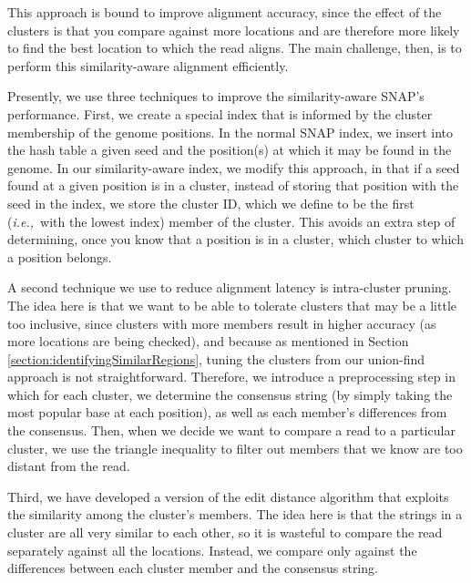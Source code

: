 \documentclass[twocolumn,10pt]{article}
\newcommand{\ie}{{\em i.e.,}~}
\begin{document}
This approach is bound to improve alignment accuracy, since the effect of the clusters is that you compare against more locations and are therefore more likely to find the best location to which the read aligns.  The main challenge, then, is to perform this similarity-aware alignment efficiently.  

Presently, we use three techniques to improve the similarity-aware SNAP's performance.  First, we create a special index that is informed by the cluster membership of the genome positions.  In the normal SNAP index, we insert into the hash table a given seed and the position(s) at which it may be found in the genome.  In our similarity-aware index, we modify this approach, in that if a seed found at a given position is in a cluster, instead of storing that position with the seed in the index, we store the cluster ID, which we define to be the first (\ie with the lowest index) member of the cluster.  This avoids an extra step of determining, once you know that a position is in a cluster, which cluster to which a position belongs.

A second technique we use to reduce alignment latency is intra-cluster pruning.  The idea here is that we want to be able to tolerate clusters that may be a little too inclusive, since clusters with more members result in higher accuracy (as more locations are being checked), and because as mentioned in Section \ref{section:identifyingSimilarRegions}, tuning the clusters from our union-find approach is not straightforward.  Therefore, we introduce a preprocessing step in which for each cluster, we determine the consensus string (by simply taking the most popular base at each position), as well as each member's differences from the consensus.  Then, when we decide we want to compare a read to a particular cluster, we use the triangle inequality to filter out members that we know are too distant from the read.  

Third, we have developed a version of the edit distance algorithm that exploits the similarity among the cluster's members.  The idea here is that the strings in a cluster are all very similar to each other, so it is wasteful to compare the read separately against all the locations.  Instead, we compare only against the differences between each cluster member and the consensus string.

\end{document}
